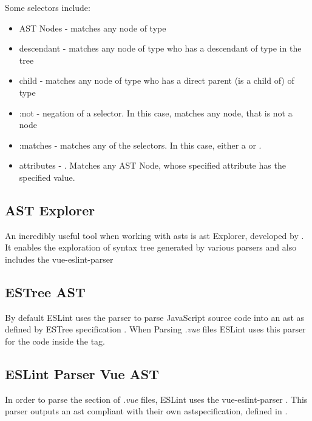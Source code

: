 Some selectors include:
\begin{itemize}
  \item AST Nodes -  matches any node of type 
  \item descendant -   matches any node of type  who has a descendant of type  in the tree
  \item child -  matches any node of type  who has a direct parent (is a child of) of type 
  \item :not - negation of a selector. In this case, matches any node, that is not a  node
  \item :matches -  matches any of the selectors. In this case, either a  or .
  \item attributes - . Matches any AST Node, whose specified attribute has the specified value.
\end{itemize}

\subsection{AST Explorer}
An incredibly useful tool when working with \glspl{ast} is \gls{ast} Explorer, developed by \textcite{astexplorer_fkling2021Jan}. It enables the exploration of syntax tree generated by various parsers and also includes the vue-eslint-parser \parencite{eslint_vue_parser}

\subsection{ESTree AST}
By default ESLint uses the \parencite{eslintEspree} parser to parse JavaScript source code into an \gls{ast} as defined by ESTree specification \parencite{estreeASTSpec}. When Parsing \textit{.vue} files ESLint uses this parser for the code inside the  tag.
  
\subsection{ESLint Parser Vue AST}

In order to parse the  section of \textit{.vue} files, ESLint uses the vue-eslint-parser \parencite{eslint_vue_parser}. This parser outputs an  \gls{ast} compliant with their own  \gls{ast}specification, defined in \parencite{eslint_vue_parser_ast}.